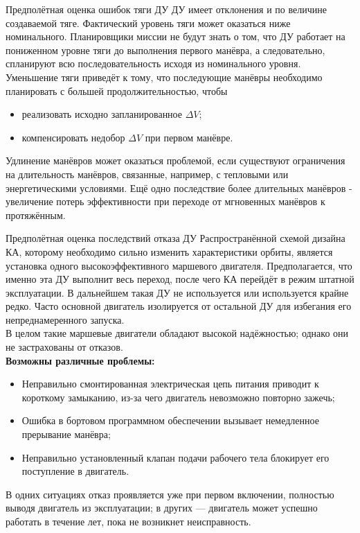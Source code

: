 \documentclass[8pt]{beamer}
\begin{document}
\begin{frame}{Предполётная оценка ошибок тяги ДУ}
ДУ имеет отклонения и по величине создаваемой тяге. Фактический уровень тяги может оказаться ниже номинального. Планировщики миссии не будут знать о том, что ДУ работает на пониженном уровне тяги до выполнения первого манёвра, а следовательно, спланируют всю последовательность исходя из номинального уровня. Уменьшение тяги приведёт к тому, что последующие манёвры необходимо планировать с большей продолжительностью, чтобы
\begin{itemize}
    \item реализовать исходно запланированное $\Delta V$;
    \item компенсировать недобор $\Delta V$ при первом манёвре.
\end{itemize}
Удлинение манёвров может оказаться проблемой, если существуют ограничения на длительность манёвров, связанные, например, с тепловыми или энергетическими условиями. Ещё одно последствие более длительных манёвров - увеличение потерь эффективности при переходе от мгновенных манёвров к протяжённым.
\end{frame}

\begin{frame}{Предполётная оценка последствий отказа ДУ}
Распространённой схемой дизайна КА, которому необходимо сильно изменить характеристики орбиты, является установка одного высокоэффективного маршевого двигателя. Предполагается, что именно эта ДУ выполнит весь переход, после чего КА перейдёт в режим штатной эксплуатации. В дальнейшем такая ДУ не используется или используется крайне редко. Часто основной двигатель изолируется от остальной ДУ для избегания его непреднамеренного запуска. \\
\smallskip
В целом такие маршевые двигатели обладают высокой надёжностью; однако они не застрахованы от отказов. \\
\textbf{Возможны различные проблемы:}
\begin{itemize}
    \item Неправильно смонтированная электрическая цепь питания приводит к короткому замыканию, из-за чего двигатель невозможно повторно зажечь;
    \item Ошибка в бортовом программном обеспечении вызывает немедленное прерывание манёвра;
    \item Неправильно установленный клапан подачи рабочего тела блокирует его поступление в двигатель.
\end{itemize}
В одних ситуациях отказ проявляется уже при первом включении, полностью выводя двигатель из эксплуатации; в других — двигатель может успешно работать в течение лет, пока не возникнет неисправность.
\end{frame}
\end{document}
